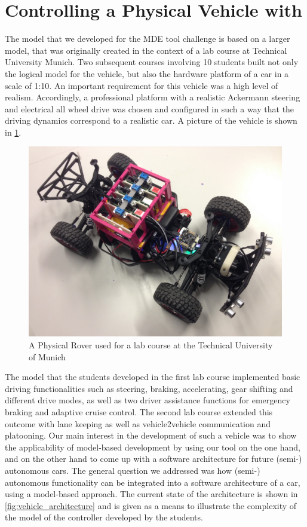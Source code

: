\section{Controlling a Physical Vehicle with \autofocus}
\label{sec:toy_rover_controller}

The model that we developed for the MDE tool challenge is based on a larger
model, that was originally created in the context of a lab course at Technical
University Munich. Two subsequent courses involving 10 students built not only 
the logical model for the vehicle, but also the hardware platform of a car in
a scale of 1:10.
An important requirement for this vehicle was a high level of realism. Accordingly,
a professional platform with a realistic Ackermann steering and electrical all
wheel drive was chosen and configured in such a way that the driving
dynamics correspond to a realistic car. A picture of the vehicle is shown in
\fig\ref{fig:vehicle}.

\begin{figure}[!h]
\centering
\includegraphics[width=1\textwidth]{images/FullSizeRender.jpg}
\caption{A Physical Rover used for a lab course at the Technical University
of Munich}
\label{fig:vehicle}
\end{figure}

The model that the students developed in the first lab course implemented basic
driving functionalities such as steering, braking, accelerating, gear shifting
and different drive modes, as well as two driver assistance functions for
emergency braking and adaptive cruise control.
The second lab course extended this outcome with lane keeping as well as
vehicle2vehicle communication and platooning.
Our main interest in the development of such a vehicle was to show the
applicability of model-based development by using our tool \autofocus on the one
hand, and on the other hand to come up with a software architecture for future
(semi-) autonomous cars. The general question we addressed was
how (semi-) autonomous functionality can be integrated into a software
architecture of a car, using a model-based approach. The current state of the
architecture is shown in \fig\ref{fig:vehicle_architecture} and is given as a
means to illustrate the complexity of the model of the controller developed by
the students.

